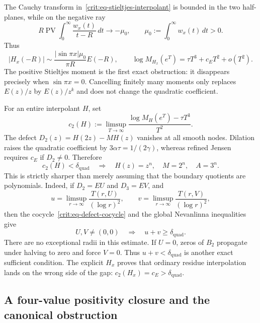 \documentclass[11pt,oneside]{article}
\theoremstyle{definition}
\theoremstyle{remark}
\begin{document}
The Cauchy transform in~\eqref{crit:eq-stieltjes-interpolant} is bounded in the two
half-planes, while on the negative ray
\[
 R\operatorname{PV}\!\int_0^\infty\frac{w_x(t)}{t-R}\,dt
 \longrightarrow-\mu_0,\qquad
 \mu_0:=\int_0^\infty w_x(t)\,dt>0.
\]
Thus
\begin{equation}
 |H_x(-R)|\sim\frac{|\sin\pi x|\mu_0}{\pi R}E(-R),
 \qquad
 \log M_{H_x}(e^T)=\tau T^3+c_ET^2+o(T^2).
 \label{crit:eq-interpolant-type}
\end{equation}
The positive Stieltjes moment is the first exact obstruction: it disappears precisely when
$\sin\pi x=0$.  Cancelling finitely many moments only replaces $E(z)/z$ by $E(z)/z^k$ and
does not change the quadratic coefficient.

For an entire interpolant $H$, set
\[
 c_2(H):=\limsup_{T\to\infty}
 \frac{\log M_H(e^T)-\tau T^3}{T^2}.
\]
The defect $D_2(z)=H(2z)-MH(z)$ vanishes at all smooth nodes.  Dilation raises the quadratic
coefficient by $3\alpha\tau=1/(2\gamma)$, whereas refined Jensen requires $c_E$ if
$D_2\ne0$.  Therefore
\begin{equation}
 \boxed{c_2(H)<\delta_{\mathrm{quad}}\quad\Longrightarrow\quad
 H(z)=z^n,\quad M=2^n,\quad A=3^n.}
 \label{crit:eq-quadratic-rigidity}
\end{equation}
This is strictly sharper than merely assuming that the boundary quotients are polynomials.
Indeed, if $D_2=EU$ and $D_3=EV$, and
\[
 u=\limsup_{r\to\infty}\frac{T(r,U)}{(\log r)^2},\qquad
 v=\limsup_{r\to\infty}\frac{T(r,V)}{(\log r)^2},
\]
then the cocycle~\eqref{crit:eq-defect-cocycle} and the global Nevanlinna inequalities give
\begin{equation}
 U,V\ne(0,0)\quad\Longrightarrow\quad u+v\ge\delta_{\mathrm{quad}}.
 \label{crit:eq-nevanlinna-gap}
\end{equation}
There are no exceptional radii in this estimate.  If $U=0$, zeros of $B_2$ propagate under
halving to zero and force $V=0$.  Thus $u+v<\delta_{\mathrm{quad}}$ is another exact sufficient condition.
The explicit $H_x$ proves that ordinary residue interpolation lands on the wrong side of the
gap: $c_2(H_x)=c_E>\delta_{\mathrm{quad}}$.

\subsection{A four-value positivity closure and the canonical obstruction}
\label{crit:positive-closure}
\end{document}
